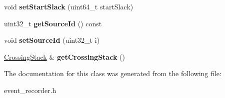 \begin{DoxyCompactItemize}
\item 
\hypertarget{classEventRecorder_a4a5078b32b484226d921538054fee4e8}{void {\bfseries set\-Start\-Slack} (uint64\-\_\-t start\-Slack)}\label{classEventRecorder_a4a5078b32b484226d921538054fee4e8}

\item 
\hypertarget{classEventRecorder_a825338b237bcd7ae9f7f65477a489a6f}{uint32\-\_\-t {\bfseries get\-Source\-Id} () const }\label{classEventRecorder_a825338b237bcd7ae9f7f65477a489a6f}

\item 
\hypertarget{classEventRecorder_a9c079787b3c2284d1defde04be45446f}{void {\bfseries set\-Source\-Id} (uint32\-\_\-t i)}\label{classEventRecorder_a9c079787b3c2284d1defde04be45446f}

\item 
\hypertarget{classEventRecorder_a37ec484c1773fbbb837c0ed5cf37acab}{\hyperlink{classg__vector}{Crossing\-Stack} \& {\bfseries get\-Crossing\-Stack} ()}\label{classEventRecorder_a37ec484c1773fbbb837c0ed5cf37acab}

\end{DoxyCompactItemize}


The documentation for this class was generated from the following file\-:\begin{DoxyCompactItemize}
\item 
event\-\_\-recorder.\-h\end{DoxyCompactItemize}
